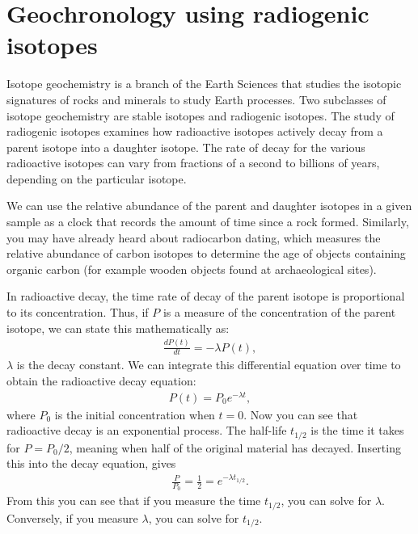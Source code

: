 \documentclass[11pt, oneside]{article}   	%
\date{}							%
\begin{document}
 
\section*{Geochronology using radiogenic isotopes}
 
Isotope geochemistry is a branch of the Earth Sciences that studies the isotopic signatures of rocks and minerals to study Earth processes. Two subclasses of isotope geochemistry are stable isotopes and radiogenic isotopes.   The study of radiogenic isotopes examines how radioactive isotopes actively decay from a parent isotope into a daughter isotope.  The rate of decay for the various radioactive isotopes can vary from fractions of a second to billions of years, depending on the particular  isotope. 

We  can use the relative abundance of the parent and daughter isotopes in a given sample as a clock that records the amount of time since a rock formed. Similarly, you may have already heard about radiocarbon dating, which measures the relative abundance of  carbon isotopes to determine the age of objects containing organic carbon (for example wooden objects found at archaeological sites).

In radioactive decay, the time rate of decay of the parent isotope is proportional to its concentration. Thus, if $P$ is a measure of the concentration of the parent isotope, we can state this mathematically as:
\begin{eqnarray}
\frac{d P(t) }{dt} = -\lambda P(t),
\end{eqnarray}
$\lambda$ is the decay constant. We can integrate this differential equation over time to obtain the radioactive decay equation:
\begin{eqnarray}
P(t) = P_0 e^{-\lambda t},
\label{decay}
\end{eqnarray}
where $P_0$ is the initial concentration when $t=0$. Now you can see that radioactive decay is an exponential process. The half-life $t_{1/2}$ is the time it takes for $P = P_0/2$, meaning when half of the original material has decayed.  Inserting this into the decay equation, gives
\begin{eqnarray}
\frac{P}{P_0} = \frac{1}{2} =  e^{-\lambda t_{1/2}}.
\label{halflife}
\end{eqnarray}
From this you can see that if you measure the time $t_{1/2}$, you can solve for $\lambda$. Conversely, if you measure $\lambda$, you can solve for $t_{1/2}$.
\end{document}
